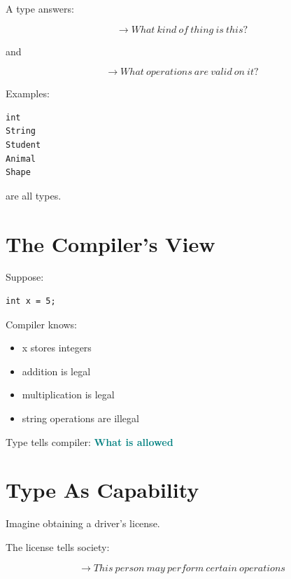 \documentclass[11pt,a4paper]{book}
\begin{document}
\begin{idea}

A type answers:

\[\rightarrow What\ kind\ of\ thing\ is\ this?\]

                    and

\[\rightarrow What\ operations\ are\ valid\ on\ it?\]
\end{idea}


Examples:

\begin{verbatim}
int
String
Student
Animal
Shape
\end{verbatim}

are all types.

\newpage
\section{The Compiler's View}

Suppose:

\begin{verbatim}
int x = 5;
\end{verbatim}

Compiler knows:

\begin{itemize}
\item x stores integers
\item addition is legal
\item multiplication is legal
\item string operations are illegal
\end{itemize}


Type tells compiler: \textcolor{teal}{\textbf{What is allowed}}



\section{Type As Capability}

\begin{mentalmodel}

Imagine obtaining a driver's license.

The license tells society:

\[\rightarrow This\ person\ may\ perform\ certain\ operations\]

\end{mentalmodel}
\end{document}

